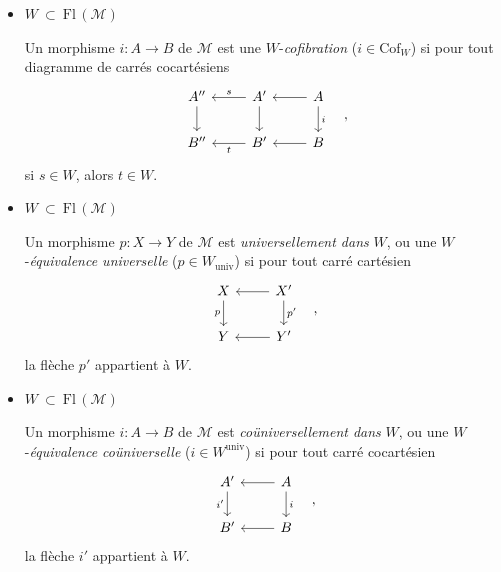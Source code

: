 \documentclass[11pt]{article}
\newcommand{\printedpage}[1]{\marginpar{\footnotesize p.~#1}}
\newcommand{\Fl}{\mathrm{Fl}\,}
\newcommand{\Mo}{\mathcal{M}}
\begin{document}
\begin{itemize}
\item[\textbullet] $W \ \subset\ \Fl(\Mo)$

Un morphisme $i : A \longrightarrow B$ de $\Mo$ est une $W$-\textit{cofibration} ($i \in \mathrm{Cof}_W$) si pour tout diagramme de carrés cocartésiens
\[
\begin{tikzcd}
A'' \arrow[d] & A' \arrow[l, "s"'] \arrow[d] & A \arrow[l] \arrow[d, "i"] \\
B'' & B' \arrow[l, "t"] & B \arrow[l]
\end{tikzcd}
\quad ,
\]
si $s \in W$, alors $t \in W$.

\item[\textbullet] $W \ \subset\ \Fl(\Mo)$

Un morphisme $p : X \longrightarrow Y$ de $\Mo$ est \textit{universellement dans} $W$, ou une $W$-\textit{équivalence universelle} ($p \in W_{\mathrm{univ}}$) si pour tout carré cartésien
\[
\begin{tikzcd}
X \arrow[d, "p"'] & X' \arrow[l] \arrow[d, "p'"] \\
Y & Y' \arrow[l]
\end{tikzcd}
\quad ,
\]
la flèche $p'$ appartient à $W$.

\item[\textbullet] $W \ \subset\ \Fl(\Mo)$

Un morphisme $i : A \longrightarrow B$ de $\Mo$ est \textit{coüniversellement dans} $W$, ou une $W$-\textit{équivalence coüniverselle} ($i \in W^{\mathrm{univ}}$) si pour tout carré cocartésien
\[
\begin{tikzcd}
A' \arrow[d, "i'"'] & A \arrow[l] \arrow[d, "i"] \\
B' & B \arrow[l]
\end{tikzcd}
\quad ,
\]
la flèche $i'$ appartient à $W$.
\end{itemize}

\printedpage{60}
\end{document}
